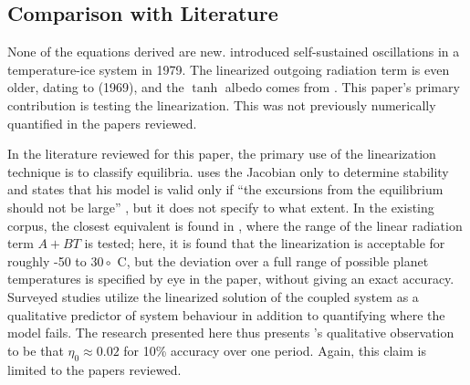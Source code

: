     \subsection{Comparison with Literature}\label{subsec:comparison-with-literature}
	None of the equations derived are new. \cite{kallenFreeOscillations1979} introduced self-sustained oscillations in a temperature-ice system in 1979. The linearized outgoing radiation term is even older, dating to \cite{budykoEffectSolar1969} (1969), and the $\tanh$ albedo comes from \cite{dortmansEnergyBalance2019}. This paper's primary contribution is testing the linearization. This was not previously numerically quantified in the papers reviewed.
	
	In the literature reviewed for this paper, the primary use of the linearization technique is to classify equilibria. \cite{plociniczakHopfBifurcation2019} uses the Jacobian only to determine stability and states that his model is valid only if ``the excursions from the equilibrium should not be large'' \parencite[19]{plociniczakHopfBifurcation2019}, but it does not specify to what extent. In the existing corpus, the closest equivalent is found in \cite{lohmannTemperaturesEnergy2020} \textcite{lohmannTemperaturesEnergy2020}, where the range of the linear radiation term $A+BT$ is tested; here, it is found that the linearization is acceptable for roughly -50 to $30\circ$ C, but the deviation over a full range of possible planet temperatures is specified by eye in the paper, without giving an exact accuracy. Surveyed studies utilize the linearized solution of the coupled system as a qualitative predictor of system behaviour in addition to quantifying where the model fails. The research presented here thus presents \cite{plociniczakHopfBifurcation2019}'s qualitative observation to be that $\eta_0\approx0.02$ for 10\% accuracy over one period. Again, this claim is limited to the papers reviewed.
	